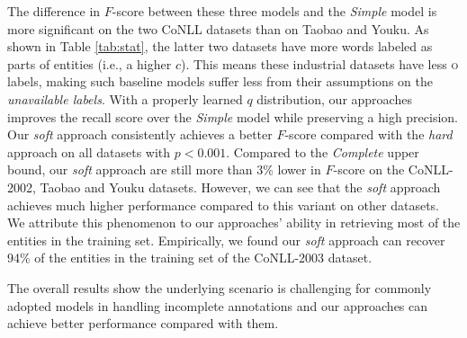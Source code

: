 The difference in $F$-score between these three models and the {\em Simple} model is more significant on the two CoNLL datasets than on Taobao and Youku. 
As shown in Table \ref{tab:stat}, the latter two datasets have more words labeled as parts of entities (i.e., a higher $c$).
This means these industrial datasets have less \textsc{o} labels, making such baseline models suffer less from their assumptions on the {\em unavailable labels}.  
With a properly learned $q$ distribution, our approaches improves the recall score over the {\em Simple} model while preserving a high precision. 
Our {\it soft} approach consistently achieves a better $F$-score compared with the {\it hard} approach  on all datasets with $p<0.001$. 
Compared to the \textit{Complete} upper bound, our {\it soft} approach are still more than 3\% lower in $F$-score on the CoNLL-2002, Taobao and Youku datasets. 
However, we can see that the {\it soft} approach achieves much higher performance compared to this variant on other datasets. 
We attribute this phenomenon to our approaches' ability in retrieving most of the entities in the training set. 
Empirically, we found our {\it soft} approach can recover 94\% of the entities in the training set of the CoNLL-2003 dataset. 

The overall results show the underlying scenario is challenging for commonly adopted models in handling incomplete annotations and our approaches can achieve better performance compared with them. 


